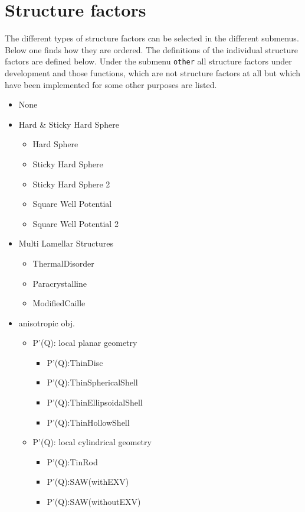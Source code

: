 \chapter{Structure factors}
\label{sec:structurefactor}
The different types of structure factors can be selected in the
different submenus. Below one finds how they are ordered. The
definitions of the individual structure factors are defined below.
Under the submenu \texttt{other} all structure factors under
development and those functions, which are not structure factors
at all but which have been implemented for some other purposes are
listed.

\begin{itemize}
\item None
\item Hard \& Sticky Hard Sphere
 \begin{itemize}
 \item Hard Sphere
 \item Sticky Hard Sphere
 \item Sticky Hard Sphere 2
 \item Square Well Potential
 \item Square Well Potential 2
\end{itemize}
\item Multi Lamellar Structures
\begin{itemize}
 \item ThermalDisorder
 \item Paracrystalline
 \item ModifiedCaille
\end{itemize}
\item anisotropic obj.
\begin{itemize}
\item P'(Q): local planar geometry
\begin{itemize}
\item P'(Q):ThinDisc
\item P'(Q):ThinSphericalShell
\item P'(Q):ThinEllipsoidalShell
\item P'(Q):ThinHollowShell
\end{itemize}
\item P'(Q): local cylindrical geometry
\begin{itemize}
\item P'(Q):TinRod
\item P'(Q):SAW(withEXV)
\item P'(Q):SAW(withoutEXV)
\end{itemize}

\end{itemize}
\end{itemize}
